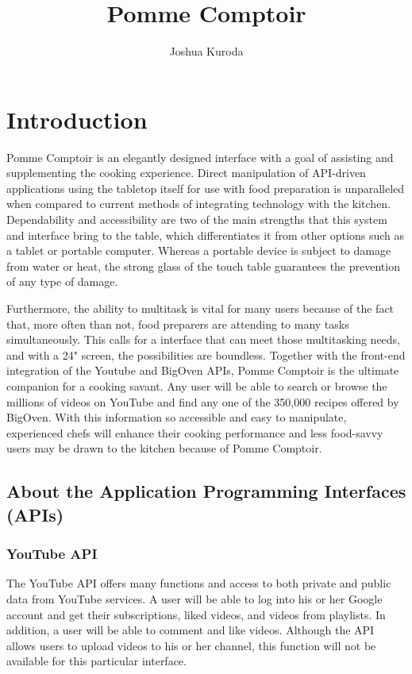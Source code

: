 \documentclass[fleqn,10pt]{wlpeerj}
\title{Pomme Comptoir}
\author[1]{Joshua Kuroda}
\affil[1]{CMSI 370-01 Interaction Design}
\affil[1]{Assignment 1124}
\affil[1]{Professor Dionisio}
\begin{document}
\flushbottom
\maketitle
\thispagestyle{empty}

\section*{Introduction}

Pomme Comptoir is an elegantly designed interface with a goal of assisting and supplementing the cooking experience. Direct manipulation of API-driven applications using the tabletop itself for use with food preparation is unparalleled when compared to current methods of integrating technology with the kitchen. Dependability and accessibility are two of the main strengths that this system and interface bring to the table, which differentiates it from other options such as a tablet or portable computer. Whereas a portable device is subject to damage from water or heat, the strong glass of the touch table guarantees the prevention of any type of damage.

Furthermore, the ability to multitask is vital for many users because of the fact that, more often than not, food preparers are attending to many tasks simultaneously. This calls for a interface that can meet those multitasking needs, and with a 24" screen, the possibilities are boundless. Together with the front-end integration of the Youtube and BigOven APIs, Pomme Comptoir is the ultimate companion for a cooking savant. Any user will be able to search or browse the millions of videos on YouTube and find any one of the 350,000 recipes offered by BigOven. With this information so accessible and easy to manipulate, experienced chefs will enhance their cooking performance and less food-savvy users may be drawn to the kitchen because of Pomme Comptoir.

\subsection*{About the Application Programming Interfaces (APIs)}
\subsubsection*{YouTube API}
The YouTube API offers many functions and access to both private and public data from YouTube services. A user will be able to log into his or her Google account and get their subscriptions, liked videos, and videos from playlists. In addition, a user will be able to comment and like videos. Although the API allows users to upload videos to his or her channel, this function will not be available for this particular interface.
\end{document}
